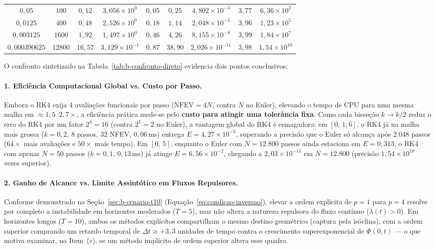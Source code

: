 \documentclass[12pt, a4paper]{article}
\begin{document}
\begin{table}[H]
{\begin{tabular}{ccccccccc}
$0{,}05$        & $100$   & $0{,}12$ & $3{,}056 \times 10^{0}$  & $0{,}05$ & $0{,}25$ & $4{,}802 \times 10^{-3}$  & $3{,}77$ & $6{,}36 \times 10^{2}$ \\
$0{,}0125$      & $400$   & $0{,}48$ & $2{,}526 \times 10^{0}$  & $0{,}18$ & $1{,}14$ & $2{,}048 \times 10^{-5}$  & $3{,}96$ & $1{,}23 \times 10^{5}$ \\
$0{,}003125$    & $1600$  & $1{,}92$ & $1{,}497 \times 10^{0}$  & $0{,}46$ & $4{,}26$ & $8{,}155 \times 10^{-8}$  & $3{,}99$ & $1{,}84 \times 10^{7}$ \\
$0{,}000390625$ & $12800$ & $16{,}57$& $3{,}129 \times 10^{-1}$ & $0{,}87$ & $38{,}90$& $2{,}026 \times 10^{-11}$ & $3{,}98$ & $1{,}54 \times 10^{10}$ \\
\bottomrule
\end{tabular}%
}
\end{table}

O confronto sintetizado na Tabela~\ref{tab:b-confronto-direto} evidencia dois pontos conclusivos:

\paragraph{1. Eficiência Computacional Global vs. Custo por Passo.}
Embora o RK4 exija $4$ avaliações funcionais por passo ($\text{NFEV} = 4N$, contra $N$ no Euler), elevando o tempo de CPU para uma mesma malha em $\approx 1{,}5\text{--}2{,}7\times$, a eficiência prática mede-se pelo \textbf{custo para atingir uma tolerância fixa}. Como cada bisseção $k \to k/2$ reduz o erro do RK4 por um fator $2^4 = 16$ (contra $2^1 = 2$ no Euler), a vantagem global do RK4 é esmagadora: em $[0,\, 1{,}6]$, o RK4 já na malha mais grossa ($k = 0{,}2$, $8$ passos, $32$ NFEV, $0{,}06\,\text{ms}$) entrega $E = 4{,}27 \times 10^{-3}$, superando a precisão que o Euler só alcança após $2.048$ passos ($64\times$ mais avaliações e $50\times$ mais tempo). Em $[0,\, 5]$, enquanto o Euler com $N = 12.800$ passos ainda estaciona em $E = 0{,}313$, o RK4 com apenas $N = 50$ passos ($k = 0{,}1$, $0{,}13\,\text{ms}$) já atinge $E = 6{,}56 \times 10^{-2}$, chegando a $2{,}03 \times 10^{-11}$ em $N = 12.800$ (precisão $1{,}54 \times 10^{10}$ vezes superior).

\paragraph{2. Ganho de Alcance vs. Limite Assintótico em Fluxos Repulsores.}
Conforme demonstrado na Seção~\ref{sec:b-cenario-t10} (Equação~\eqref{eq:condicao-inversao}), elevar a ordem explícita de $p = 1$ para $p = 4$ resolve por completo a instabilidade em horizontes moderados ($T = 5$), mas não altera a natureza repulsora do fluxo contínuo ($\lambda(t) > 0$). Em horizontes longos ($T = 10$), ambos os métodos explícitos compartilham o mesmo destino geométrico (captura pela isóclina), com a ordem superior comprando um retardo temporal de $\Delta t \approx +3{,}3$ unidades de tempo contra o crescimento superexponencial de $\Phi(0, t)$ — o que motiva examinar, no Item~(c), se um método implícito de ordem superior altera esse quadro.
\end{document}
